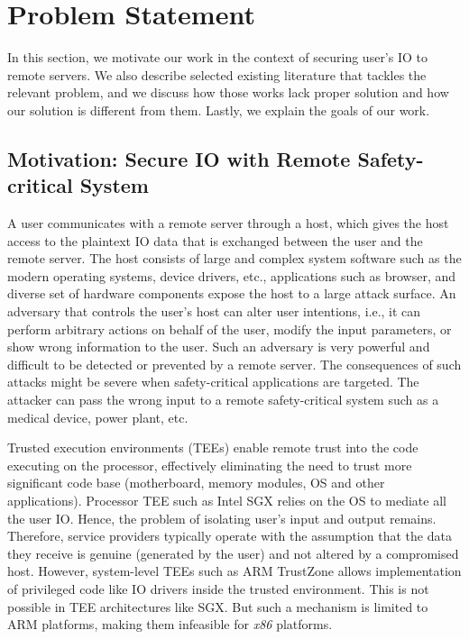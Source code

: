\section{Problem Statement}
\label{sec:problemStatement}

In this section, we motivate our work in the context of securing user's IO to remote servers. We also describe selected existing literature that tackles the relevant problem, and we discuss how those works lack proper solution and how our solution is different from them. Lastly, we explain the goals of our work.

\subsection{Motivation: Secure IO with Remote Safety-critical System}

A user communicates with a remote server through a host, which gives the host access to the plaintext IO data that is exchanged between the user and the remote server. The host consists of large and complex system software such as the modern operating systems, device drivers, etc., applications such as browser, and diverse set of hardware components expose the host to a large attack surface. An adversary that controls the user's host can alter user intentions, i.e., it can perform arbitrary actions on behalf of the user, modify the input parameters, or show wrong information to the user. Such an adversary is very powerful and difficult to be detected or prevented by a remote server. The consequences of such attacks might be severe when safety-critical applications are targeted. The attacker can pass the wrong input to a remote safety-critical system such as a medical device, power plant, etc.

Trusted execution environments (TEEs) enable remote trust into the code executing on the processor, effectively eliminating the need to trust more significant code base (motherboard, memory modules, OS and other applications). Processor TEE such as Intel SGX relies on the OS to mediate all the user IO. Hence, the problem of isolating user's input and output remains. Therefore, service providers typically operate with the assumption that the data they receive is genuine (generated by the user) and not altered by a compromised host. However, system-level TEEs such as ARM TrustZone allows implementation of privileged code like IO drivers inside the trusted environment. This is not possible in TEE architectures like SGX. But such a mechanism is limited to ARM platforms, making them infeasible for \emph{x86} platforms. %


